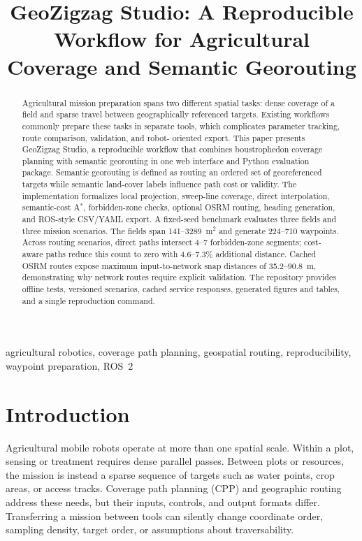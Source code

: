 \documentclass[conference,a4paper]{IEEEtran}
\title{GeoZigzag Studio: A Reproducible Workflow for Agricultural Coverage and Semantic Georouting}
\author{
\IEEEauthorblockN{Luis Prieto-Lopez, Sergio Sanchez de La Fuente,
Miguel A. Gonzalez-Santamarta}
\IEEEauthorblockN{Angel Manuel Guerrero-Higueras, Lidia Sanchez-Gonzalez,
Francisco J. Rodriguez-Lera}
\IEEEauthorblockA{University of Leon, Leon, Spain\\
\texttt{luisprietolopez@protonmail.com}}
}
\begin{document}
\maketitle

\begin{abstract}
Agricultural mission preparation spans two different spatial tasks: dense
coverage of a field and sparse travel between geographically referenced
targets. Existing workflows commonly prepare these tasks in separate tools,
which complicates parameter tracking, route comparison, validation, and robot-
oriented export. This paper presents GeoZigzag Studio, a reproducible workflow
that combines boustrophedon coverage planning with semantic georouting in one
web interface and Python evaluation package. Semantic georouting is defined as
routing an ordered set of georeferenced targets while semantic land-cover
labels influence path cost or validity. The implementation formalizes local
projection, sweep-line coverage, direct interpolation, semantic-cost A$^\ast$,
forbidden-zone checks, optional OSRM routing, heading generation, and ROS-style
CSV/YAML export. A fixed-seed benchmark evaluates three fields and three
mission scenarios. The fields span 141--3289~m$^2$ and generate 224--710
waypoints. Across routing scenarios, direct paths intersect 4--7 forbidden-zone
segments; cost-aware paths reduce this count to zero with 4.6--7.3\% additional
distance. Cached OSRM routes expose maximum input-to-network snap distances of
35.2--90.8~m, demonstrating why network routes require explicit validation.
The repository provides offline tests, versioned scenarios, cached service
responses, generated figures and tables, and a single reproduction command.
\end{abstract}

\begin{IEEEkeywords}
agricultural robotics, coverage path planning, geospatial routing,
reproducibility, waypoint preparation, ROS~2
\end{IEEEkeywords}

\section{Introduction}
Agricultural mobile robots operate at more than one spatial scale. Within a
plot, sensing or treatment requires dense parallel passes. Between plots or
resources, the mission is instead a sparse sequence of targets such as water
points, crop areas, or access tracks. Coverage path planning (CPP) and
geographic routing address these needs, but their inputs, controls, and output
formats differ. Transferring a mission between tools can silently change
coordinate order, sampling density, target order, or assumptions about
traversability.
\end{document}
